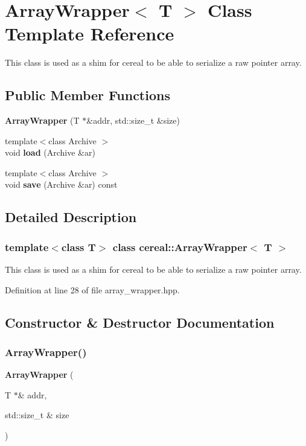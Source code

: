 \section{Array\+Wrapper$<$ T $>$ Class Template Reference}
\label{classcereal_1_1ArrayWrapper}


This class is used as a shim for cereal to be able to serialize a raw pointer array.  


\subsection*{Public Member Functions}
\begin{DoxyCompactItemize}
\item 
\textbf{ Array\+Wrapper} (T $\ast$\&addr, std\+::size\+\_\+t \&size)
\item 
{\footnotesize template$<$class Archive $>$ }\\void \textbf{ load} (Archive \&ar)
\item 
{\footnotesize template$<$class Archive $>$ }\\void \textbf{ save} (Archive \&ar) const
\end{DoxyCompactItemize}


\subsection{Detailed Description}
\subsubsection*{template$<$class T$>$\newline
class cereal\+::\+Array\+Wrapper$<$ T $>$}

This class is used as a shim for cereal to be able to serialize a raw pointer array. 

Definition at line 28 of file array\+\_\+wrapper.\+hpp.



\subsection{Constructor \& Destructor Documentation}
\mbox{\label{classcereal_1_1ArrayWrapper_a04e571aad2c1d83a6c8bf98e4d3ae67e}} 
\subsubsection{Array\+Wrapper()}
{\footnotesize\ttfamily \textbf{ Array\+Wrapper} (\begin{DoxyParamCaption}\item[{T $\ast$\&}]{addr,  }\item[{std\+::size\+\_\+t \&}]{size }\end{DoxyParamCaption})\hspace{0.3cm}{\ttfamily [inline]}}



